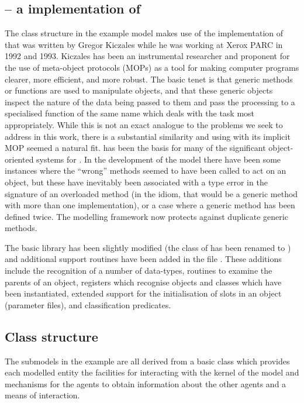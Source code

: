 \subsection{\SCLOS -- a \Scheme implementation of \CLOS}

The class structure in the example model makes use of the \Scheme
implementation of \SCLOS that was written by Gregor
Kiczales \cite{kiczales1993xerox} while he was working at Xerox PARC
in 1992 and 1993.  Kiczales has been an instrumental researcher and
proponent for the use of meta-object protocols (MOPs) as a tool for
making computer programs clearer, more efficient, and more robust.
The basic tenet is that generic methods or functions are used to
manipulate objects, and that these generic objects inspect the nature
of the data being passed to them and pass the processing to a
specialised function of the same name which deals with the task most
appropriately.  While this is not an exact analogue to the problems we
seek to address in this work, there is a substantial similarity and
using \SCLOS with its implicit MOP seemed a natural fit.  \SCLOS has
been the basis for many of the significant object-oriented systems for
\Scheme.  In the development of the model there have been some
instances where the ``wrong'' methods seemed to have been
called to act on an object, but these have inevitably been associated
with a type error in the signature of an overloaded method (in
the \SCLOS idiom, that would be a generic method with more than one
implementation), or a case where a generic method has been defined
twice. The modelling framework now protects against duplicate generic
methods. 

The basic \SCLOS library has been slightly modified
(the  class of \SCLOS has been renamed
to ) and additional support routines have
been added in the file .  These additions
include the recognition of a number of \Scheme data-types, routines to
examine the parents of an object, registers which recognise objects
and classes which have been instantiated, extended support for the
initialisation of slots in an \SCLOS object (parameter files), and
classification predicates.  

\subsection{Class structure}
The submodels in the example are all derived from a basic
 class which provides each modelled entity the
facilities for interacting with the kernel of the model and mechanisms
for the agents to obtain information about the other agents and a
means of interaction.

